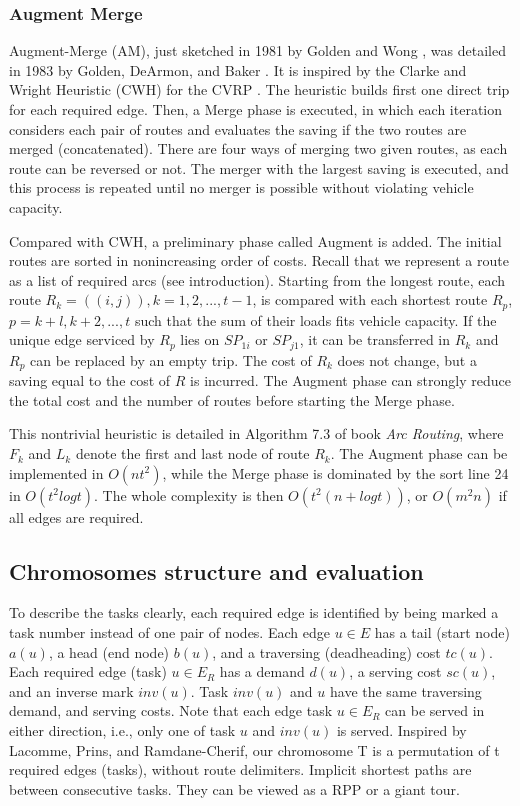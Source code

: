 \documentclass[journal,twoside,web]{ieeecolor}
\begin{document}
\subsubsection{Augment Merge}
Augment-Merge (AM), just sketched in 1981 by Golden and Wong \cite{Golden1981}, was detailed in 1983 by Golden, DeArmon, and Baker \cite{Golden1983}. It is inspired by the Clarke and Wright Heuristic (CWH) for the CVRP \cite{Clarke2012}. The heuristic builds first one direct trip for each
required edge. Then, a Merge phase is executed, in which each iteration considers each pair of routes and evaluates the saving if the two routes are merged (concatenated). There are four ways of merging two given routes, as each route can be reversed or not. The merger with the largest saving is executed, and this process is repeated until no merger is possible without violating vehicle capacity.
\par
Compared with CWH, a preliminary phase called Augment is added. The initial routes are sorted in nonincreasing order of costs. Recall that we represent a route as a list of required arcs (see introduction). Starting from the longest route, each route $R_k =( (i,j)), k = 1,2,...,t-1$, is compared with each shortest route $R_p$, $p = k + l,k + 2,...,t$ such that the sum of their loads fits vehicle capacity. If the unique edge serviced by $R_p$ lies on $SP_{1i}$ or $SP_{j1}$, it can be transferred in $R_k$ and $R_p$ can be replaced by an empty trip. The cost of $R_k$ does not change, but a saving equal to the cost of $R$ is incurred. The Augment phase can strongly reduce the total cost and the number of routes before starting the Merge phase. \par
This nontrivial heuristic is detailed in Algorithm 7.3 of book \textit{Arc Routing}\cite{Corberan2015}, where $F_k$ and $L_k$ denote the first and last node of route $R_k$. The Augment phase can be implemented in $O(nt^2)$, while the Merge phase is dominated by the sort line 24 in $O(t^2logt)$. The whole complexity is then $O(t^{2}(n+logt))$, or $O(m^2n)$ if all edges are required.

\subsection{Chromosomes structure and evaluation}
\label{sec:chromesome}
To describe the tasks clearly, each required edge is identified by being marked a task number instead of one pair of nodes. Each edge $u \in E$ has a tail (start node) $a(u)$, a head (end node) $b(u)$, and a traversing (deadheading) cost $tc(u)$. Each required edge (task) $u \in E_R$ has a demand $d(u)$, a serving cost $sc(u)$, and an inverse mark $inv(u)$. Task $inv(u)$ and $u$ have the same traversing demand, and serving costs. Note that each edge task $u\in E_R$ can be served in either direction, i.e., only one of task $u$ and $inv(u)$ is served. Inspired by Lacomme, Prins, and Ramdane-Cherif\cite{Lacomme2001}, our chromosome T is a permutation of t required edges (tasks), without route delimiters. Implicit shortest paths are between consecutive tasks. They can be viewed as a RPP or a giant tour.
\end{document}
